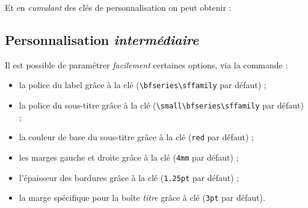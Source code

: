 \documentclass[french,11pt,a4paper]{article}
\begin{document}
\begin{demohigh}[language=latex/latex2,style/main=cyan!10,style/code=cyan!10]
\begin{BoiteDeDemo}[Logo={example-image},HauteurLogo=5mm,RotationLogo=10]
\lipsum[1][3-4]
\end{BoiteDeDemo}
\end{demohigh}

\begin{demohigh}[language=latex/latex2,style/main=cyan!10,style/code=cyan!10]
\begin{BoiteDeDemo}[Icone={\faYoutube},EchelleIcone=1.25,RotationLogo=15]
	\lipsum[1][3-4]
\end{BoiteDeDemo}
\end{demohigh}

Et en \textit{cumulant} des clés de personnalisation on peut obtenir :

\begin{demohigh}[language=latex/latex2,style/main=cyan!10,style/code=cyan!10]
\begin{BoiteDeDemo}[%
    ModifLabel={s super importants},ComplementTitre={ (vraiment super importants)},%
    SousTitre={- Source -},Compteur=false,Logo={example-image-a},%
    HauteurLogo=1cm,RotationLogo=15,OpaciteLogo=1
    ]
\lipsum[2][1-4]
\end{BoiteDeDemo}
\end{demohigh}

\pagebreak

\subsection{Personnalisation \textit{intermédiaire}}

Il est possible de paramétrer \textit{facilement} certaines options, via la commande  :

\begin{itemize}
	\item la police du label grâce à la clé \MontreCode{[PoliceTitre=...]} (\verb*|\bfseries\sffamily| par défaut) ;
	\item la police du sous-titre grâce à la clé \MontreCode{[PoliceSousTitre=...]} (\verb*|\small\bfseries\sffamily| par défaut) ;
	\item la couleur de base du sous-titre grâce à la clé \MontreCode{[CouleurSousTitre=...]} (\verb*|red| par défaut) ;
	\item les marges gauche et droite grâce à la clé \MontreCode{[Marge=...]} (\verb*|4mm| par défaut) ;
	\item l'épaisseur des bordures grâce à la clé \MontreCode{[EpaisseurBordure=...]} (\verb*|1.25pt| par défaut) ;
	\item la marge spécifique pour la boîte \textit{titre} grâce à clé \MontreCode{[MargeTitre=...]} (\verb*|3pt| par défaut).
\end{itemize}
\end{document}
